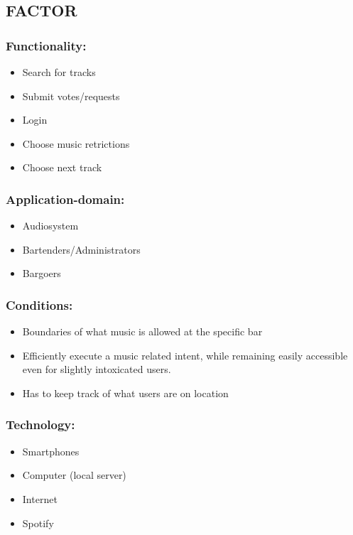 \subsection{FACTOR}
\subsubsection{Functionality:}
\begin{itemize}
	\item Search for tracks
	\item Submit votes/requests	
	\item Login
	\item Choose music retrictions
	\item Choose next track
\end{itemize}

\subsubsection{Application-domain:}
\begin{itemize}
	\item Audiosystem
	\item Bartenders/Administrators	
	\item Bargoers
\end{itemize}

\subsubsection{Conditions:}
\begin{itemize}
	\item Boundaries of what music is allowed at the specific bar 
	\item Efficiently execute a music related intent, while remaining easily accessible even for slightly intoxicated users.	
	\item Has to keep track of what users are on location
\end{itemize}



\subsubsection{Technology:}
\begin{itemize}
	\item Smartphones
	\item Computer (local server)	
	\item Internet
	\item Spotify
\end{itemize}

